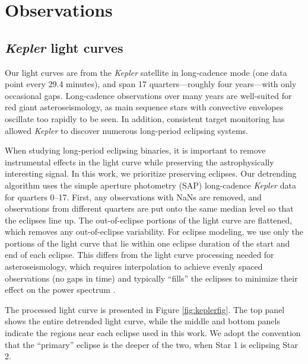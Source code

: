 \section{Observations}\label{data}

\subsection{\emph{Kepler} light curves}\label{kepler}
Our light curves are from the \emph{Kepler} satellite in long-cadence mode (one data point every 29.4 minutes), and span 17 quarters---roughly four years---with only occasional gaps. Long-cadence observations over many years are well-suited for red giant asteroseismology, as main sequence stars with convective envelopes oscillate too rapidly to be seen. In addition, consistent target monitoring has allowed \emph{Kepler} to discover numerous long-period eclipsing systems.

When studying long-period eclipsing binaries, it is important to remove instrumental effects in the light curve while preserving the astrophysically interesting signal. In this work, we prioritize preserving eclipses. Our detrending algorithm uses the simple aperture photometry (SAP) long-cadence \emph{Kepler} data for quarters 0--17. First, any observations with NaNs are removed, and observations from different quarters are put onto the same median level so that the eclipses line up. The out-of-eclipse portions of the light curve are flattened, which removes any out-of-eclipse variability. For eclipse modeling, we use only the portions of the light curve that lie within one eclipse duration of the start and end of each eclipse. This differs from the light curve processing needed for asteroseismology, which requires interpolation to achieve evenly spaced observations (no gaps in time) and typically ``fills'' the eclipses to minimize their effect on the power spectrum \citep{gau14}.

The processed light curve is presented in Figure \ref{fig:keplerfig}. The top panel shows the entire detrended light curve, while the middle and bottom panels indicate the regions near each eclipse used in this work. We adopt the convention that the ``primary'' eclipse is the deeper of the two, when Star 1 is eclipsing Star 2.
  